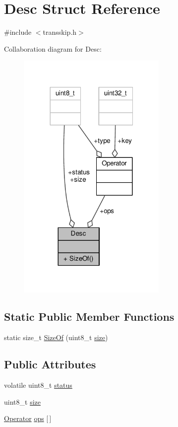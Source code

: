 \hypertarget{structDesc}{\section{Desc Struct Reference}
\label{structDesc}
}


{\ttfamily \#include $<$transskip.\-h$>$}



Collaboration diagram for Desc\-:
\nopagebreak
\begin{figure}[H]
\begin{center}
\leavevmode
\includegraphics[width=204pt]{structDesc__coll__graph}
\end{center}
\end{figure}
\subsection*{Static Public Member Functions}
\begin{DoxyCompactItemize}
\item 
static size\-\_\-t \hyperlink{structDesc_a17991ab3e594e316aba8e6f3016e1f02}{Size\-Of} (uint8\-\_\-t \hyperlink{structDesc_a1a146b0ca2a38b593e7605d66eb95a18}{size})
\end{DoxyCompactItemize}
\subsection*{Public Attributes}
\begin{DoxyCompactItemize}
\item 
volatile uint8\-\_\-t \hyperlink{structDesc_a8ab3f25f43809ec536df5c68375010e2}{status}
\item 
uint8\-\_\-t \hyperlink{structDesc_a1a146b0ca2a38b593e7605d66eb95a18}{size}
\item 
\hyperlink{structOperator}{Operator} \hyperlink{structDesc_a1cc2e62a24c7879890faeacf74ccae1d}{ops} \mbox{[}$\,$\mbox{]}
\end{DoxyCompactItemize}



